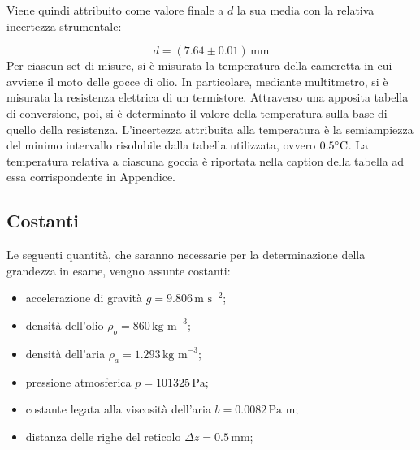 \documentclass[]{article}
\let\oldsubsection\subsection%
\renewcommand{\subsection}{%
	\renewcommand{\theequation}{\thesubsection.\arabic{equation}}%
	\oldsubsection}%
\begin{document}
    Viene quindi attribuito come valore finale a $ d $ la sua media con la relativa incertezza strumentale:

    \begin{equation}
        \label{misura_Rb}
        d = (7.64 \pm 0.01) \, \text{mm}
    \end{equation} 
    Per ciascun set di misure, si è misurata la temperatura della cameretta in cui avviene il moto delle gocce di olio. In particolare, mediante multitmetro, si è misurata la resistenza elettrica di un termistore. Attraverso una apposita tabella di conversione, poi, si è determinato il valore della temperatura sulla base di quello della resistenza. L'incertezza attribuita alla temperatura è la semiampiezza del minimo intervallo risolubile dalla tabella utilizzata, ovvero $0.5 \degree \text{C}$.
    La temperatura relativa a ciascuna goccia è riportata nella caption della tabella ad essa corrispondente in Appendice.

    \subsection {Costanti}
    \label{par:costanti}

    Le seguenti quantità, che saranno necessarie per la determinazione della grandezza in esame, vengno assunte costanti:
    \begin{itemize}
        \item accelerazione di gravità $g = 9.806 \, \text{m s}^{-2}$;
        \item densità dell'olio $\rho_o = 860 \, \text{kg m}^{-3}$;
        \item densità dell'aria $\rho_a = 1.293 \, \text{kg m}^{-3}$;
        \item pressione atmosferica $ p = 101325 \, \text{Pa}$;
        \item costante legata alla viscosità dell'aria $b = 0.0082 \,  \text{Pa m}$;
        \item distanza delle righe del reticolo $ \Delta z = 0.5 \, \text{mm}$;
    \end{itemize}
\end{document}
